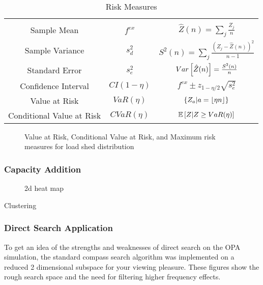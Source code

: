 \newcommand{\tabheight}{11pt}
\begin{table}
\centering
\begin{tabular}{| c | c | c|}
\hline
& & \\[1pt]
Sample Mean & $f^{ex}$ &$ \hat{Z}(n)=\sum_j \frac{Z_j}{n} $\\[\tabheight]
Sample Variance & $s^2_d$ &$ S^2(n)=\sum_j \frac{\left(Z_j - \hat{Z}(n)\right)^2}{n-1} $\\[\tabheight]
Standard Error & $s^2_e$ &$ Var\left[ \hat{Z}(n) \right]= \frac{S^2(n)}{n}$\\[\tabheight]
Confidence Interval& $CI(1-\eta)$  & $f^{ex} \pm z_{1-\eta/2} \sqrt{s^2_e}$ \\[\tabheight]
Value at Risk & $ VaR(\eta)$& $ \left\{ Z_{a} |  a = \lfloor  \eta n  \rfloor\right\} $\\[\tabheight]  %
Conditional Value at Risk & $ CVaR(\eta)$& $\mathbb{E}\left[ Z | Z \geq VaR(\eta) \right]$ \\[\tabheight]
\hline
\end{tabular}
\caption{Risk Measures}\label{tab:risk}
\end{table}

\begin{figure}
\centering

\caption{Value at Risk, Conditional Value at Risk, and Maximum risk measures for load shed distribution}
\end{figure}



\subsubsection{Capacity Addition}




\begin{figure}
\centering

\caption{2d heat map}
\end{figure}


Clustering \endnote{}


\subsubsection{Direct Search Application}

To get an idea of the strengths and weaknesses of direct search on the OPA simulation, the standard compass search algorithm was implemented on a reduced 2 dimensional subspace for your viewing pleasure.  These figures show the rough search space and the need for filtering higher frequency effects.

